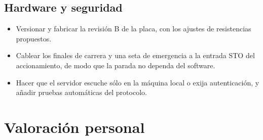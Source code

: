\subsection{Hardware y seguridad}
\begin{itemize}
  \item Versionar y fabricar la revisión B de la placa, con los ajustes de resistencias propuestos.
  \item Cablear los finales de carrera y una seta de emergencia a la entrada STO del accionamiento, de
        modo que la parada no dependa del software.
  \item Hacer que el servidor escuche sólo en la máquina local o exija autenticación, y añadir pruebas
        automáticas del protocolo.
\end{itemize}

\section{Valoración personal}

